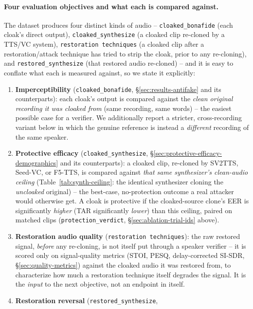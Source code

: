 \documentclass[11pt]{article}
\begin{document}
\paragraph{Four evaluation objectives and what each is compared
against.} The dataset produces four distinct kinds of audio --
\texttt{cloaked\_bonafide} (each cloak's direct output),
\texttt{cloaked\_synthesize} (a cloaked clip re-cloned by a TTS/VC
system), \texttt{restoration techniques} (a cloaked clip after a
restoration/attack technique has tried to strip the cloak, prior to
any re-cloning), and \texttt{restored\_synthesize} (that restored
audio re-cloned) -- and it is easy to conflate what each is measured
against, so we state it explicitly:
\begin{enumerate}
  \item \textbf{Imperceptibility} (\texttt{cloaked\_bonafide}, \S\ref{sec:results-antifake}
    and its counterparts): each cloak's output is compared against the
    \emph{clean original recording it was cloaked from} (same
    recording, same words) -- the easiest possible case for a
    verifier. We additionally report a stricter, cross-recording
    variant below in which the genuine reference is instead a
    \emph{different} recording of the same speaker.
  \item \textbf{Protective efficacy} (\texttt{cloaked\_synthesize},
    \S\ref{sec:protective-efficacy-demographics} and its
    counterparts): a cloaked clip, re-cloned by SV2TTS, Seed-VC, or
    F5-TTS, is compared against \emph{that same synthesizer's
    clean-audio ceiling} (Table~\ref{tab:synth-ceiling}: the identical
    synthesizer cloning the \emph{uncloaked} original) -- the
    best-case, no-protection outcome a real attacker would otherwise
    get. A cloak is protective if the cloaked-source clone's EER is
    significantly \emph{higher} (TAR significantly \emph{lower}) than
    this ceiling, paired on matched clips
    (\texttt{protection\_verdict}, \S\ref{sec:ablation-trial-ids}
    above).
  \item \textbf{Restoration audio quality} (\texttt{restoration
    techniques}): the raw restored signal, \emph{before} any
    re-cloning, is not itself put through a speaker verifier -- it is
    scored only on signal-quality metrics (STOI, PESQ, delay-corrected
    SI-SDR, \S\ref{sec:quality-metrics}) against the cloaked audio it
    was restored from, to characterize how much a restoration
    technique itself degrades the signal. It is the \emph{input} to
    the next objective, not an endpoint in itself.
  \item \textbf{Restoration reversal} (\texttt{restored\_synthesize},

\end{enumerate}
\end{document}

